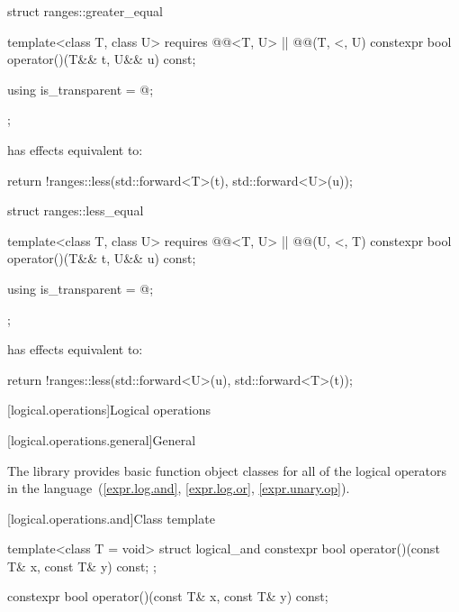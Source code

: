 %
\begin{itemdecl}
struct ranges::greater_equal {
  template<class T, class U>
    requires @@<T, U> || @@(T, <, U)
    constexpr bool operator()(T&& t, U&& u) const;

  using is_transparent = @\unspecnc@;
};
\end{itemdecl}

\begin{itemdescr}
\pnum
{} has effects equivalent to:
\begin{codeblock}
return !ranges::less{}(std::forward<T>(t), std::forward<U>(u));
\end{codeblock}
\end{itemdescr}

%
\begin{itemdecl}
struct ranges::less_equal {
  template<class T, class U>
    requires @@<T, U> || @@(U, <, T)
    constexpr bool operator()(T&& t, U&& u) const;

  using is_transparent = @\unspecnc@;
};
\end{itemdecl}

\begin{itemdescr}
\pnum
{} has effects equivalent to:
\begin{codeblock}
return !ranges::less{}(std::forward<U>(u), std::forward<T>(t));
\end{codeblock}
\end{itemdescr}

[logical.operations]{Logical operations}

[logical.operations.general]{General}

\pnum
The library provides basic function object classes for all of the logical
operators in the language~(\ref{expr.log.and}, \ref{expr.log.or}, \ref{expr.unary.op}).

[logical.operations.and]{Class template }

%
\begin{itemdecl}
template<class T = void> struct logical_and {
  constexpr bool operator()(const T& x, const T& y) const;
};
\end{itemdecl}

%
\begin{itemdecl}
constexpr bool operator()(const T& x, const T& y) const;
\end{itemdecl}

